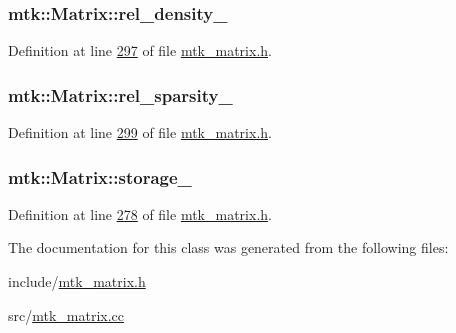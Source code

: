 \hypertarget{classmtk_1_1Matrix_adae5d1f3016d891e67a10d6db658d5a7}{
\subsubsection[{rel\+\_\+density\+\_\+}]{ mtk\+::\+Matrix\+::rel\+\_\+density\+\_\+\hspace{0.3cm}{\ttfamily [private]}}}\label{classmtk_1_1Matrix_adae5d1f3016d891e67a10d6db658d5a7}


Definition at line \hyperlink{mtk__matrix_8h_source_l00297}{297} of file \hyperlink{mtk__matrix_8h_source}{mtk\+\_\+matrix.\+h}.

\hypertarget{classmtk_1_1Matrix_aab48952c7df158b6ee06d8c2c901aa7e}{
\subsubsection[{rel\+\_\+sparsity\+\_\+}]{ mtk\+::\+Matrix\+::rel\+\_\+sparsity\+\_\+\hspace{0.3cm}{\ttfamily [private]}}}\label{classmtk_1_1Matrix_aab48952c7df158b6ee06d8c2c901aa7e}


Definition at line \hyperlink{mtk__matrix_8h_source_l00299}{299} of file \hyperlink{mtk__matrix_8h_source}{mtk\+\_\+matrix.\+h}.

\hypertarget{classmtk_1_1Matrix_ae343697531e0849f20bed4a9760b9a54}{
\subsubsection[{storage\+\_\+}]{ mtk\+::\+Matrix\+::storage\+\_\+\hspace{0.3cm}{\ttfamily [private]}}}\label{classmtk_1_1Matrix_ae343697531e0849f20bed4a9760b9a54}


Definition at line \hyperlink{mtk__matrix_8h_source_l00278}{278} of file \hyperlink{mtk__matrix_8h_source}{mtk\+\_\+matrix.\+h}.



The documentation for this class was generated from the following files\+:\begin{DoxyCompactItemize}
\item 
include/\hyperlink{mtk__matrix_8h}{mtk\+\_\+matrix.\+h}\item 
src/\hyperlink{mtk__matrix_8cc}{mtk\+\_\+matrix.\+cc}\end{DoxyCompactItemize}
